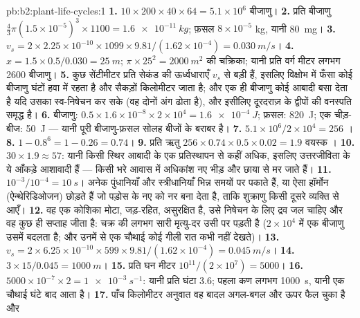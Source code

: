 \begin{solution}{pb:b2:plant-life-cycles:1}
\textbf{1.} $10\times 200\times 40\times 64 = 5.1\times 10^{6}$
बीजाणु।
\textbf{2.} प्रति बीजाणु $\tfrac43\pi(1.5\times 10^{-5})^3\times 1100 =
\qty{1.6e-11}{kg}$; फ़सल $8\times 10^{-5}$ kg, यानी \qty{80}{mg}।
\textbf{3.} $v_s = 2\times 2.25\times 10^{-10}\times 1099\times
9.81/(1.62\times 10^{-4}) = \qty{0.030}{m/s}$।
\textbf{4.} $x = 1.5\times 0.5/0.030 = \qty{25}{m}$;
$\pi\times 25^2 = \qty{2000}{m^2}$ की चक्रिका; यानी प्रति वर्ग मीटर
लगभग \num{2600} बीजाणु।
\textbf{5.} कुछ सेंटीमीटर प्रति सेकंड की ऊर्ध्वधाराएँ $v_s$ से बड़ी
हैं, इसलिए विक्षोभ में फँसा कोई बीजाणु घंटों हवा में रहता है और सैकड़ों
किलोमीटर जाता है; और एक ही बीजाणु कोई आबादी बसा देता है यदि उसका
 स्व-निषेचन कर सके (वह दोनों अंग ढोता है), और इसीलिए
दूरदराज़ के द्वीपों की  वनस्पति समृद्ध है।
\textbf{6.} बीजाणु: $0.5\times 1.6\times 10^{-8}\times 2\times 10^{4} =
\qty{1.6e-4}{J}$; फ़सल: \qty{820}{J}; एक चीड़-बीज: \qty{50}{J} ---
यानी पूरी बीजाणु-फ़सल सोलह बीजों के बराबर है।
\textbf{7.} $5.1\times 10^{6}/2\times 10^{4} = 256$ ।
\textbf{8.} $1 - 0.8^{6} = 1 - 0.26 = 0.74$।
\textbf{9.} प्रति ऋतु $256\times 0.74\times 0.5\times 0.02 = 1.9$ वयस्क
।
\textbf{10.} $30\times 1.9 \approx 57$: यानी किसी स्थिर आबादी के एक
प्रतिस्थापन से कहीं अधिक, इसलिए उत्तरजीविता के ये आँकड़े आशावादी हैं ---
किसी भरे आवास में अधिकांश नए  भीड़ और छाया से मर
जाते हैं।
\textbf{11.} $10^{-3}/10^{-4} = \qty{10}{s}$। अनेक 
पुंधानियाँ और स्त्रीधानियाँ भिन्न समयों पर पकाते हैं, या ऐसा हॉर्मोन
(ऐन्थेरिडिओजन) छोड़ते हैं जो पड़ोस के नए  को नर बना देता है,
ताकि शुक्राणु किसी दूसरे व्यक्ति से आएँ।
\textbf{12.} वह एक कोशिका मोटा, जड़-रहित, असुरक्षित है, उसे निषेचन के
लिए द्रव जल चाहिए और वह कुछ ही सप्ताह जीता है: चक्र की लगभग सारी
मृत्यु-दर उसी पर पड़ती है ($2\times 10^{4}$ में एक बीजाणु उसमें बदलता
है; और उनमें से एक चौथाई कोई गीली रात कभी नहीं देखते)।
\textbf{13.} $v_s = 2\times 6.25\times 10^{-10}\times 599\times
9.81/(1.62\times 10^{-4}) = \qty{0.045}{m/s}$।
\textbf{14.} $3\times 15/0.045 = \qty{1000}{m}$।
\textbf{15.} प्रति घन मीटर $10^{11}/(2\times 10^{7}) = \num{5000}$।
\textbf{16.} $5000\times 10^{-7}\times 2 = \qty{1e-3}{s^{-1}}$: यानी
प्रति घंटा 3.6; पहला कण लगभग \qty{1000}{s}, यानी एक चौथाई घंटे बाद आता
है।
\textbf{17.} पाँच किलोमीटर अनुवात वह बादल अगल-बगल और ऊपर फैल चुका है और

\end{solution}
